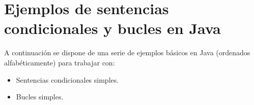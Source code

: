 \chapter{Ejemplos de sentencias condicionales y bucles en Java}

A continuación se dispone de una serie de ejemplos básicos en Java (ordenados alfabéticamente) para trabajar con:

\begin{itemize}
	\item Sentencias condicionales simples.
	\item Bucles simples.
\end{itemize}

\centering

\begin{framed}
	
\end{framed}

\begin{framed}
	
\end{framed}

\begin{framed}
	
\end{framed}

\begin{framed}
	
\end{framed}

\begin{framed}
	
\end{framed}

\begin{framed}
	
\end{framed}


